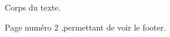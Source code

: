 \documentclass[a4paper,french,11pt]{report}
\begin{document}
Corps du texte.

\newpage

Page numéro 2 ,permettant de voir le footer.


\printbibliography[heading=bibintoc,title={Bibliographie}]

\end{document}
